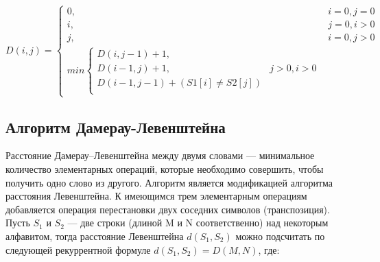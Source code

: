 \documentclass[a4paper, 14pt]{article}
\begin{document}
\begin{displaymath}
D(i,j) = \left\{ \begin{array}{ll}
 0, & \textrm{$i = 0, j = 0$}\\
 i, & \textrm{$j = 0, i > 0$}\\
 j, & \textrm{$i = 0, j > 0$}\\
min\begin{cases}
D(i,j-1)+1,\\
D(i-1, j) +1, &\textrm{$j>0, i>0$}\\
D(i-1, j-1) + (S1[i] \neq S2[j])\\
	\end{cases}
  \end{array} \right.
\end{displaymath}
	
	\newpage
	\subsection{Алгоритм Дамерау-Левенштейна}
	
	Расстояние Дамерау–Левенштейна между двумя словами — минимальное количество элементарных операций, которые необходимо совершить, чтобы получить одно слово из другого. Алгоритм является модификацией алгоритма расстояния Левенштейна. К имеющимся трем элементарным операциям добавляется операция перестановки двух соседних символов (транспозиция).\\
	
Пусть $S_{1}$ и $S_{2}$ — две строки (длиной M и N соответственно) над некоторым алфавитом, тогда расстояние Левенштейна $d(S_{1}, S_{2})$ можно подсчитать по следующей рекуррентной формуле $d(S_{1}, S_{2}) = D(M, N)$, где:
		    
\end{document}
